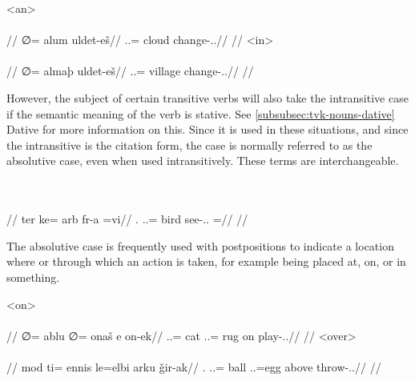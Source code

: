 	\a<an>\begingl
		\glpreamble{}\\
		\\
		//
		\gla ∅= alum uldet-eš//
		\glb \An.\Sg.\Intr= cloud change-\Ind.\Npst.\Rtsp//
		\glft{}//
	\endgl
	\a<in>\begingl
		\glpreamble{}\\
		\\
		//
		\gla ∅= almaþ uldet-eš//
		\glb \In.\Sg.\Intr= village change-\Ind.\Npst.\Rtsp//
		\glft{}//
	\endgl
\xe

However, the subject of certain transitive verbs will also take the intransitive case if the semantic meaning of the verb is stative. See \autoref{subsubsec:tvk-nouns-dative} Dative for more information on this. Since it is used in these situations, and since the intransitive is the citation form, the case is normally referred to as the absolutive case, even when used intransitively. These terms are interchangeable.

	\begingl
		\glpreamble{}\\
		\\
		//
		\gla ter ke= arb fr-a =vi//
		\glb \Sps.\Abs{} \An.\Sg.\Dat= bird see-\Ind.\Npst.\Ipfv{} =\Q//
		\glft{}//
	\endgl
\xe

The absolutive case is frequently used with postpositions to indicate a location where or through which an action is taken, for example being placed at, on, or in something.

	\a<on>\begingl
		\glpreamble{}\\
		\\
		//
		\gla ∅= ablu ∅= onaš e on-ek//
		\glb \An.\Sg.\Abs= cat \In.\Sg.\Abs= rug on play-\Ind.\Pst.\Pfv//
		\glft{}//
	\endgl
	\a<over>\begingl
		\glpreamble{}\\
		\\
		//
		\gla mod ti= ennis le=elbi arku ǧir-ak//
		\glb \Fps.\Erg{} \In.\Sg.\Acc= ball \In.\Pc.\Abs=egg above throw-\Ind.\Pst.\Pfv//
		\glft{}//
	\endgl
\xe


